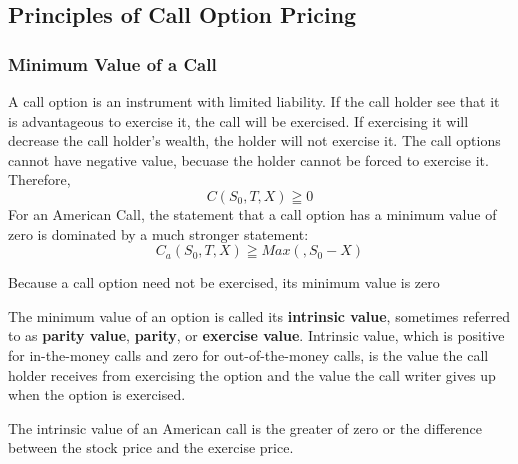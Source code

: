 \documentclass{book}
\theoremstyle{definition}
\theoremstyle{remark}
\begin{document}
    \newpage
    \subsection{Principles of Call Option Pricing}
        \subsubsection{Minimum Value of a Call}
            A call option is an instrument with limited liability. If the call holder see that it is advantageous to exercise it, the call will be exercised. If exercising it will decrease the call holder's wealth, the holder will not exercise it. The call options cannot have negative value, becuase the holder cannot be forced to exercise it. Therefore, 
                \begin{equation}
                    C(S_0, T, X) \geqq 0
                \end{equation}
            For an American Call, the statement that a call option has a minimum value of zero is dominated by a much stronger statement: 
                \begin{equation}
                    C_a(S_0, T, X) \geqq Max(, S_0 - X)
                \end{equation}
            
        \begin{tcolorbox}[colback=blue!5!white,colframe=blue!75!black, title=Sticky Note]
            Because a call option need not be exercised, its minimum value is zero 
        \end{tcolorbox}              
            
            The minimum value of an option is called its \textbf{intrinsic value}, sometimes referred to as \textbf{parity value}, \textbf{parity}, or \textbf{exercise value}. Intrinsic value, which is positive for in-the-money calls and zero for out-of-the-money calls, is the value the call holder receives from exercising the option and the value the call writer gives up when the option is exercised. 
            
        \begin{tcolorbox}[colback=blue!5!white,colframe=blue!75!black, title=Sticky Note]
            The intrinsic value of an American call is the greater of zero or the difference between the stock price and the exercise price. 
        \end{tcolorbox}              
            
\end{document}
